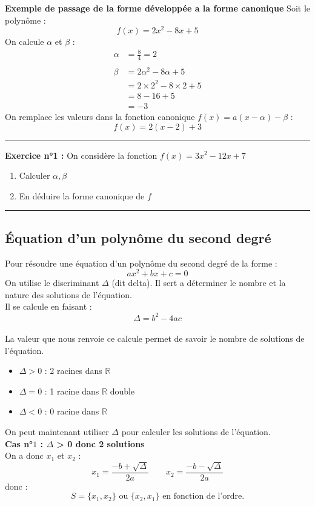 \documentclass{article}
\begin{document}
	\textbf{Exemple de passage de la forme développée a la forme canonique}
	Soit le polynôme :
	\[
		f(x) = 2x^2 - 8x + 5
	\]
	On calcule $\alpha$ et $\beta$ :
	\begin{align*}
		\alpha &= \frac{8}{4} = 2 \\\\
		\beta &= 2\alpha^2 - 8\alpha + 5 \\
		&= 2 \times 2^2 - 8 \times 2 + 5 \\
		&= 8 - 16 + 5 \\
		&= -3
	\end{align*}
	On remplace les valeurs dans la fonction canonique $f(x) = a(x - \alpha) - \beta$ : 
	\[
		f(x) = 2(x - 2) + 3
	\]
	
	\rule{\textwidth}{0.4pt}
	
	\noindent \textbf{Exercice n°1 :}
	On considère la fonction $f(x) = 3x^2 - 12x + 7$
	\begin{enumerate}
		\item Calculer $\alpha, \beta$
		\item En déduire la forme canonique de $f$
	\end{enumerate}
	
	\rule{\textwidth}{0.4pt}
	\subsection{Équation d'un polynôme du second degré}
	Pour résoudre une équation d'un polynôme du second degré de la forme :
	\[
		ax^2 + bx + c = 0
	\]
	On utilise le \b{discriminant} $\Delta$ (dit delta). Il sert a déterminer le nombre et la nature des solutions de l'équation.\\ Il se calcule en faisant :
	\[
		\Delta = b^2 - 4ac
	\]\\
	La valeur que nous renvoie ce calcule permet de savoir le nombre de solutions de l'équation.
	\begin{itemize}
		\item $\Delta > 0$ : 2 racines dans $\mathbb{R}$
		\item $\Delta = 0$ : 1 racine dans $\mathbb{R}$ double
		\item $\Delta < 0$ : 0 racine dans $\mathbb{R}$\\
	\end{itemize}
	
	\noindent On peut maintenant utiliser $\Delta$ pour calculer les solutions de l'équation.\\
	
	\textbf{Cas n°$1$ : $\Delta$ > 0 donc 2 solutions} \\
	On a donc $x_1$ et $x_2$ :
	\[
	x_1 = \frac{-b + \sqrt{\Delta}}{2a} \quad \quad x_2 = \frac{-b - \sqrt{\Delta}}{2a}
	\]
	donc :
	\[
	S = \{x_1, x_2\} \text{ ou } \{x_2, x_1\} \text{ en fonction de l'ordre.}
	\]
	
\end{document}
